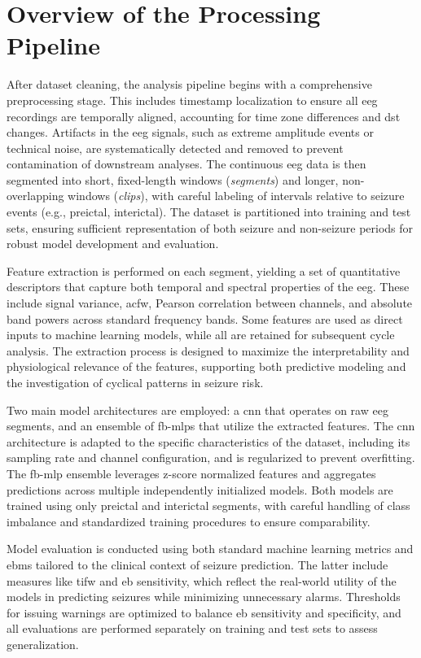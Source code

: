 \section{Overview of the Processing Pipeline} \label{sec:pipeline-overview}

After dataset cleaning, the analysis pipeline begins with a comprehensive preprocessing stage.
This includes timestamp localization to ensure all \gls{eeg} recordings are temporally aligned, accounting for time zone differences and \gls{dst} changes.
Artifacts in the \gls{eeg} signals, such as extreme amplitude events or technical noise, are systematically detected and removed to prevent contamination of downstream analyses.
The continuous \gls{eeg} data is then segmented into short, fixed-length windows (\textit{segments}) and longer, non-overlapping windows (\textit{clips}), with careful labeling of intervals relative to seizure events (e.g., preictal, interictal).
The dataset is partitioned into training and test sets, ensuring sufficient representation of both seizure and non-seizure periods for robust model development and evaluation.

Feature extraction is performed on each segment, yielding a set of quantitative descriptors that capture both temporal and spectral properties of the \gls{eeg}.
These include signal variance, \gls{acfw}, Pearson correlation between channels, and absolute band powers across standard frequency bands.
Some features are used as direct inputs to machine learning models, while all are retained for subsequent cycle analysis.
The extraction process is designed to maximize the interpretability and physiological relevance of the features, supporting both predictive modeling and the investigation of cyclical patterns in seizure risk.

Two main model architectures are employed: a \gls{cnn} that operates on raw \gls{eeg} segments, and an ensemble of \glspl{fb-mlp} that utilize the extracted features.
The \gls{cnn} architecture is adapted to the specific characteristics of the dataset, including its sampling rate and channel configuration, and is regularized to prevent overfitting.
The \gls{fb-mlp} ensemble leverages z-score normalized features and aggregates predictions across multiple independently initialized models.
Both models are trained using only preictal and interictal segments, with careful handling of class imbalance and standardized training procedures to ensure comparability.

Model evaluation is conducted using both standard machine learning metrics and \glspl{ebm} tailored to the clinical context of seizure prediction.
The latter include measures like \gls{tifw} and \gls{eb} sensitivity, which reflect the real-world utility of the models in predicting seizures while minimizing unnecessary alarms.
Thresholds for issuing warnings are optimized to balance \gls{eb} sensitivity and specificity, and all evaluations are performed separately on training and test sets to assess generalization.

